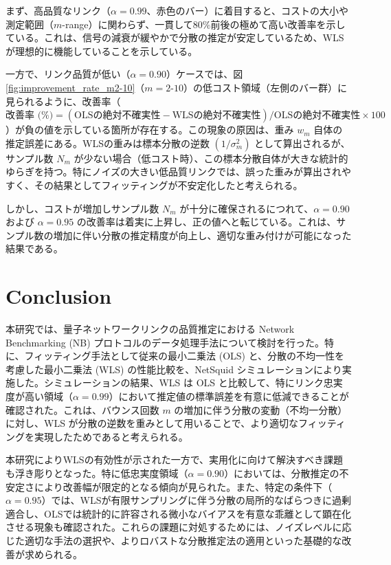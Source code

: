 \documentclass[12pt,a4paper,titlepage,dvipdfmx]{article}
\begin{document}
まず、高品質なリンク（$\alpha=0.99$、赤色のバー）に着目すると、コストの大小や測定範囲（$m$-range）に関わらず、一貫して80\%前後の極めて高い改善率を示している。これは、信号の減衰が緩やかで分散の推定が安定しているため、WLSが理想的に機能していることを示している。

一方で、リンク品質が低い（$\alpha=0.90$）ケースでは、図\ref{fig:improvement_rate_m2-10}（$m=2\text{-}10$）の低コスト領域（左側のバー群）に見られるように、改善率（$\text{改善率 (\%)} = (\text{OLSの絶対不確実性} - \text{WLSの絶対不確実性}) / \text{OLSの絶対不確実性} \times 100$）が負の値を示している箇所が存在する。この現象の原因は、重み $w_m$ 自体の推定誤差にある。WLSの重みは標本分散の逆数 $(1/\sigma_m^2)$ として算出されるが、サンプル数 $N_m$ が少ない場合（低コスト時）、この標本分散自体が大きな統計的ゆらぎを持つ。特にノイズの大きい低品質リンクでは、誤った重みが算出されやすく、その結果としてフィッティングが不安定化したと考えられる。

しかし、コストが増加しサンプル数 $N_m$ が十分に確保されるにつれて、$\alpha=0.90$ および $\alpha=0.95$ の改善率は着実に上昇し、正の値へと転じている。これは、サンプル数の増加に伴い分散の推定精度が向上し、適切な重み付けが可能になった結果である。


\newpage
\section{Conclusion}
\label{sec:conclusion}
本研究では、量子ネットワークリンクの品質推定における Network Benchmarking (NB) プロトコルのデータ処理手法について検討を行った。特に、フィッティング手法として従来の最小二乗法 (OLS) と、分散の不均一性を考慮した最小二乗法 (WLS) の性能比較を、NetSquid シミュレーションにより実施した。シミュレーションの結果、WLS は OLS と比較して、特にリンク忠実度が高い領域（$\alpha=0.99$）において推定値の標準誤差を有意に低減できることが確認された。これは、バウンス回数 $m$ の増加に伴う分散の変動（不均一分散）に対し、WLS が分散の逆数を重みとして用いることで、より適切なフィッティングを実現したためであると考えられる。

本研究によりWLSの有効性が示された一方で、実用化に向けて解決すべき課題も浮き彫りとなった。特に低忠実度領域（$\alpha=0.90$）においては、分散推定の不安定さにより改善幅が限定的となる傾向が見られた。また、特定の条件下（$\alpha=0.95$）では、WLSが有限サンプリングに伴う分散の局所的なばらつきに過剰適合し、OLSでは統計的に許容される微小なバイアスを有意な乖離として顕在化させる現象も確認された。これらの課題に対処するためには、ノイズレベルに応じた適切な手法の選択や、よりロバストな分散推定法の適用といった基礎的な改善が求められる。
\end{document}
